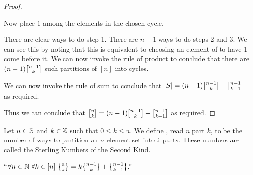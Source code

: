\begin{proof}
\begin{itemize}
\begin{itemize}
\begin{enumerate}
                                    Now place $1$ among the elements in the chosen cycle.
                            \end{enumerate}
                            There are clear  ways to do step 1. There
                            are $n - 1$ ways to do steps 2 and 3. We can see this by noting
                            that this is equivalent to choosing an element of 
                            to have 1 come before it. We can now invoke the rule of product
                            to conclude that there are $(n - 1) \npermk{n - 1}{k}$ such partitions
                            of $[n]$ into cycles.
                    \end{itemize}
                    We can now invoke the rule of sum to conclude that  
                    $|S| = (n - 1) \npermk{n - 1}{k} + \npermk{n - 1}{k - 1}$
                    as required.
            \end{itemize}
            Thus we can conclude that $\npermk{n}{k} = (n - 1) \npermk{n - 1}{k} + \npermk{n - 1}{k - 1}$
            as required. \QED
        \end{proof}
        \begin{definition}
            Let $n \in \mathbb{N}$ and $k \in \mathbb{Z}$ such that $0 \le k \le n$. We define
            , read $n$ part $k$, to be the number of ways to partition
            an $n$ element set into $k$ parts. These numbers are called the Sterling Numbers
            of the Second Kind.
        \end{definition}
        \begin{theorem}
            ``$\forall n \in \set{N} \ \forall k \in [n] \ \npartk{n}{k} = k \npartk{n - 1}{k} + \npartk{n - 1}{k - 1}$.''
        \end{theorem}

